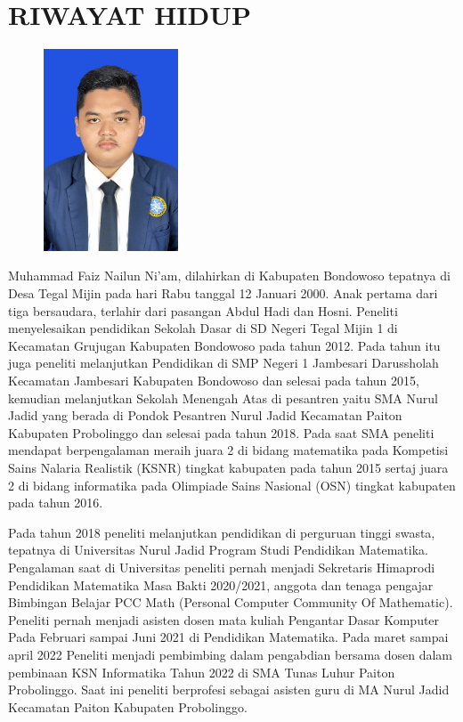 \newpage
\chapter*{RIWAYAT HIDUP}

\noindent
\begin{figure}
\includegraphics[width=4cm, height=6cm]{Gambar/pas foto.jpg} 
\end{figure}

Muhammad Faiz Nailun Ni'am, dilahirkan di Kabupaten Bondowoso tepatnya di Desa Tegal Mijin pada hari Rabu tanggal 12 Januari 2000. Anak pertama dari tiga bersaudara, terlahir dari pasangan Abdul Hadi dan Hosni. Peneliti menyelesaikan pendidikan Sekolah Dasar di SD Negeri Tegal Mijin 1 di Kecamatan Grujugan Kabupaten Bondowoso pada tahun 2012. Pada tahun itu juga peneliti melanjutkan Pendidikan di SMP Negeri 1 Jambesari Darussholah Kecamatan Jambesari Kabupaten Bondowoso dan selesai pada tahun 2015, kemudian melanjutkan Sekolah Menengah Atas di pesantren yaitu SMA Nurul Jadid yang berada di Pondok Pesantren Nurul Jadid Kecamatan Paiton Kabupaten Probolinggo dan selesai pada tahun 2018. Pada saat SMA peneliti mendapat berpengalaman meraih juara 2 di bidang matematika pada Kompetisi Sains Nalaria Realistik (KSNR) tingkat kabupaten pada tahun 2015 sertaj juara 2 di bidang informatika pada Olimpiade Sains Nasional (OSN) tingkat kabupaten pada tahun 2016.

Pada tahun 2018 peneliti melanjutkan pendidikan di perguruan tinggi swasta, tepatnya di Universitas Nurul Jadid Program Studi Pendidikan Matematika. Pengalaman saat di Universitas peneliti pernah menjadi Sekretaris Himaprodi Pendidikan Matematika Masa Bakti 2020/2021, anggota dan tenaga pengajar Bimbingan Belajar PCC Math (Personal Computer Community Of Mathematic). Peneliti pernah menjadi asisten dosen mata kuliah Pengantar Dasar Komputer Pada Februari sampai Juni 2021 di Pendidikan Matematika. Pada maret sampai april 2022 Peneliti menjadi pembimbing dalam pengabdian bersama dosen dalam pembinaan KSN Informatika Tahun 2022 di SMA Tunas Luhur Paiton Probolinggo. Saat ini peneliti berprofesi sebagai asisten guru di MA Nurul Jadid Kecamatan Paiton Kabupaten Probolinggo. 